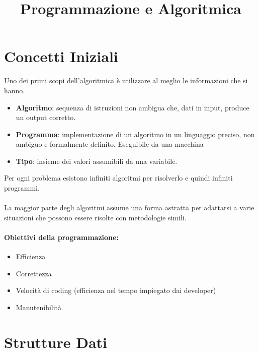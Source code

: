\documentclass[a4paper,12pt]{article}
\title{Programmazione e Algoritmica}
\author{}
\date{}
\let\oldsection\section
\renewcommand{\section}{\clearpage\oldsection}
\begin{document}
\maketitle
\tableofcontents
\section{Concetti Iniziali}

Uno dei primi scopi dell’algoritmica è utilizzare al meglio le informazioni che si hanno.
\begin{itemize}
  \item \textbf{Algoritmo}: sequenza di istruzioni non ambigua che, dati in input, produce un output corretto.
  \item \textbf{Programma}: implementazione di un algoritmo in un linguaggio preciso, non ambiguo e formalmente definito. Eseguibile da una macchina
  \item \textbf{Tipo}: insieme dei valori assumibili da una variabile.
\end{itemize}
Per ogni problema esistono infiniti algoritmi per risolverlo e quindi infiniti programmi.\\\\
La maggior parte degli algoritmi assume una forma astratta per adattarsi a varie situazioni che possono essere risolte con metodologie simili.

\paragraph{Obiettivi della programmazione:}
\begin{itemize}
  \item Efficienza
  \item Correttezza
  \item Velocità di coding (efficienza nel tempo impiegato dai developer)
  \item Manutenibilità
\end{itemize}

\section{Strutture Dati}
\end{document}
